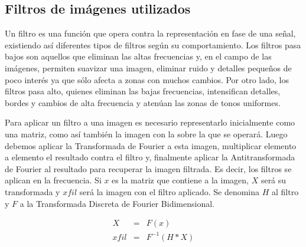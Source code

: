 \documentclass{article}
\begin{document}
\begin{multicols}{2}



\par 

\subsection{Filtros de imágenes utilizados}
\label{sec3}
\par Un filtro es una función que opera contra la representación en fase de una señal, existiendo así diferentes tipos de filtros según su comportamiento. Los filtros pasa bajos son aquellos que eliminan las altas frecuencias y, en el campo de las imágenes, permiten suavizar una imagen, eliminar ruido y detalles pequeños de poco interés ya que sólo afecta a zonas con muchos cambios. Por otro lado, los filtros pasa alto, quienes eliminan las bajas frecuencias, intensifican detalles, bordes y cambios de alta frecuencia y atenúan las zonas de tonos uniformes.

\par Para aplicar un filtro a una imagen es necesario representarlo inicialmente como una matriz, como así también la imagen con la sobre la que se operará. Luego debemos aplicar la Transformada de Fourier a esta imagen, multiplicar elemento a elemento el resultado contra el filtro y, finalmente aplicar la Antitransformada de Fourier al resultado para recuperar la imagen filtrada. Es decir, los filtros se aplican en la frecuencia. Si $x$ es la matriz que contiene a la imagen, $X$ será su transformada y $xfil$ será la imagen con el filtro aplicado. Se denomina $H$ al filtro y $F$ a la Transformada Discreta de Fourier Bidimensional.

\begin{eqnarray*}
    X &=& F(x)\\
    xfil &=& F^{-1}(H * X)
\end{eqnarray*}


\end{multicols}
\end{document}
